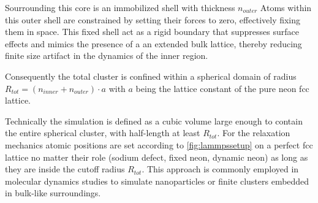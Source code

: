 Sourrounding this core is an immobilized shell with thickness $n_{outer}$
Atoms within this outer shell are constrained by setting their forces to zero, effectively fixing them in space. This fixed shell act as a rigid boundary that suppresses surface effects and mimics the presence of a an extended bulk lattice, thereby reducing finite size artifact in the dynamics of the inner region.

Consequently the total cluster is confined within a spherical domain of radius $R_{tot}=(n_{inner}+n_{outer})\cdot a$ with $a$ being the lattice constant of the pure neon \ac{fcc} lattice. 

Technically the simulation is defined as a cubic volume large enough to contain the entire spherical cluster, with half-length at least $R_{tot}$.
For the relaxation mechanics atomic positions are set according to \ref{fig:lammpssetup} on a perfect \ac{fcc} lattice no matter their role (sodium defect, fixed neon, dynamic neon) as long as they are inside the cutoff radius $R_{tot}$.
This approach is commonly employed in molecular dynamics studies to simulate nanoparticles or finite clusters embedded in bulk-like surroundings.
